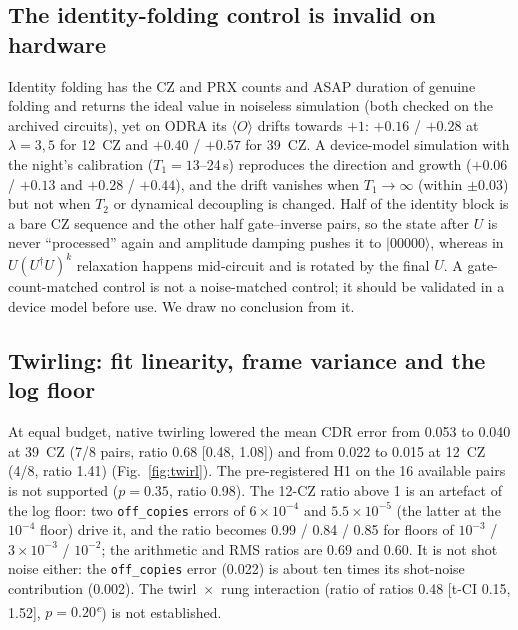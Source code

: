 \documentclass[conference]{IEEEtran}
\newcommand{\ev}[1]{\langle #1\rangle}
\newcommand{\ket}[1]{|#1\rangle}
\newcommand{\arm}[1]{\texttt{#1}}
\newcommand{\expl}{\textsuperscript{\textit{e}}}
\begin{document}
\subsection{The identity-folding control is invalid on hardware}\label{sec:identity}
Identity folding has the CZ and PRX counts and ASAP duration of genuine folding and returns the
ideal value in noiseless simulation (both checked on the archived circuits), yet on ODRA its
$\ev{O}$ drifts towards $+1$: $+0.16$ / $+0.28$ at $\lambda=3,5$ for 12~CZ and $+0.40$ / $+0.57$
for 39~CZ. A device-model simulation with the night's calibration ($T_1=13$--24\,\textmu s)
reproduces the direction and growth ($+0.06$ / $+0.13$ and $+0.28$ / $+0.44$), and the drift
vanishes when $T_1\to\infty$ (within $\pm0.03$) but not when $T_2$ or dynamical decoupling is
changed. Half of the identity block is a bare CZ sequence and the other half gate--inverse
pairs, so the state after $U$ is never ``processed'' again and amplitude damping pushes it to
$\ket{00000}$, whereas in $U(U^\dagger U)^k$ relaxation happens mid-circuit and is rotated by
the final $U$. A gate-count-matched control is not a noise-matched control; it should be
validated in a device model before use. We draw no conclusion from it.

\subsection{Twirling: fit linearity, frame variance and the log floor}
At equal budget, native twirling lowered the mean CDR error from 0.053 to 0.040 at 39~CZ (7/8
pairs, ratio 0.68 [0.48, 1.08]) and from 0.022 to 0.015 at 12~CZ (4/8, ratio 1.41)
(Fig.~\ref{fig:twirl}). The pre-registered H1 on the 16 available pairs is not supported
($p=0.35$, ratio 0.98). The 12-CZ ratio above 1 is an artefact of the log floor: two
\arm{off\_copies} errors of $6\times10^{-4}$ and $5.5\times10^{-5}$ (the latter at the
$10^{-4}$ floor) drive it, and the ratio becomes 0.99 / 0.84 / 0.85 for floors of $10^{-3}$ /
$3\times10^{-3}$ / $10^{-2}$; the arithmetic and RMS ratios are 0.69 and 0.60. It is not shot
noise either: the \arm{off\_copies} error (0.022) is about ten times its shot-noise
contribution (0.002). The twirl~$\times$~rung interaction (ratio of ratios 0.48 [t-CI 0.15,
1.52], $p=0.20$\expl) is not established.
\end{document}
